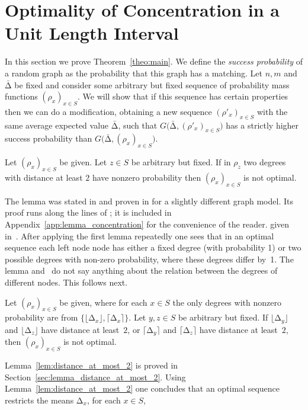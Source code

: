 \let\accentvec\vec \documentclass{llncs}
\newcommand{\pmf}{\ensuremath{{\rho}}}
\newcommand{\mean}{{\mathrm{\scriptstyle\Delta}}}
\newcommand{\Amean}{\bar{\mean}}
\newcommand{\floor}[1]{\ensuremath{\lfloor #1\rfloor}}
\newcommand{\ceil}[1]{\ensuremath{\lceil #1\rceil}}
\newcommand{\graph}{\ensuremath{G}}
\begin{document}
\section{Optimality of Concentration in a Unit Length Interval}
In this section we prove Theorem~\ref{theo:main}.
We define the \emph{success probability} of a random graph as the probability that this graph has a matching.
Let $n,m$ and $\Amean$ be fixed and consider some arbitrary but fixed sequence of probability mass functions $(\pmf_x)_{x\in S}$.
We will show that if this sequence has certain properties then we can do a modification, obtaining a new sequence $(\pmf'_x)_{x\in S}$ 
with the same average expected value $\Amean$, such that $\graph\big( \Amean, (\pmf'_x)_{x\in S}\big)$ has 
a strictly higher success probability than $\graph\big( \Amean, (\pmf_x)_{x\in S}\big)$.
\begin{lemma}
\label{lem:concentration_around_mean}
Let $(\pmf_x)_{x\in S}$ be given.
Let $z\in S$ be arbitrary but fixed.
If in $\pmf_z$ two degrees with distance at least $2$ have nonzero probability then $(\pmf_x)_{x\in S}$ is not optimal.
\end{lemma}
The lemma was stated in \cite{DGMMPR_tight_2010} and proven in \cite{DGMMPR_tight_2009_full} for a slightly different graph model.
Its proof runs along the lines of \cite{DGMMPR_tight_2009_full}; it is 
\ifnum{}
included in Appendix~\ref{app:lemma_concentration} for the convenience of the reader.
\else
given in~\cite[Appendix A]{full_version}.
\fi
After applying the first lemma repeatedly one sees that in an optimal sequence
each left node node has either a fixed degree (with probability 1) or two possible degrees with non-zero probability,
where these degrees differ by~1.
The lemma and~\cite{DGMMPR_tight_2009_full,DGMMPR_tight_2010} do not say anything about the relation between the degrees of different nodes.
This follows next.
\begin{lemma}
\label{lem:distance_at_most_2}
Let $(\pmf_x)_{x\in S}$ be given, where for each $x\in S$ the only degrees with 
nonzero probability are from $\{\floor{\mean_x},\ceil{\mean_x}\}$.
Let $y,z\in S$ be arbitrary but fixed.
If $\floor{\mean_y}$ and $\floor{\mean_z}$ have distance at least~$2$, 
or $\ceil{\mean_y}$ and $\ceil{\mean_z}$ have distance at least~$2$,
then $(\pmf_x)_{x\in S}$ is not optimal.
\end{lemma}
Lemma~\ref{lem:distance_at_most_2} is proved in Section~\ref{sec:lemma_distance_at_most_2}.
Using Lemma~\ref{lem:distance_at_most_2} one concludes that an optimal sequence restricts the means $\mean_x$, for each $x\in S$,
\end{document}
